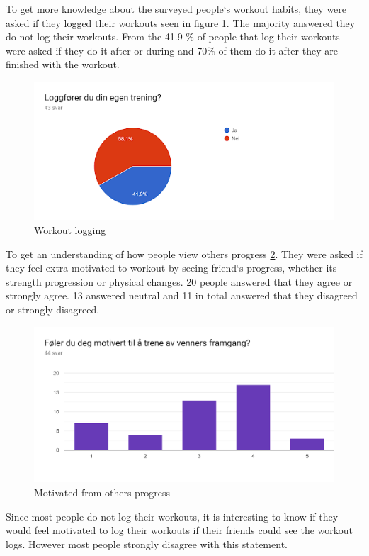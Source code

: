 To get more knowledge about the surveyed people`s workout habits, they were asked if they logged their workouts seen in figure \ref{workoutlogging}. The majority answered they do not log their workouts.  From the 41.9 \% of people that log their workouts were asked if they do it after or during and 70\% of them do it after they are finished with the workout.

\begin{figure}[H]
    \centering
    \includegraphics[width=120mm]{figures/loggforerduegentrening.png}
    \caption{Workout logging}
    \label{workoutlogging}
\end{figure}
To get an understanding of how people view others progress \ref{others}. They were asked if they feel extra motivated to workout by seeing friend`s progress, whether its strength progression or physical changes. 20 people answered that they agree or strongly agree. 13 answered neutral and 11 in total answered that they disagreed or strongly disagreed.
\begin{figure}[H]
    \centering
    \includegraphics[width=120mm]{figures/MotivertAvAndresTrening.png}
    \caption{Motivated from others progress}
    \label{others}
\end{figure}
Since most people do not log their workouts, it is interesting to know if they would feel motivated to log their workouts if their friends could see the workout logs. However most people strongly disagree with this statement. 

